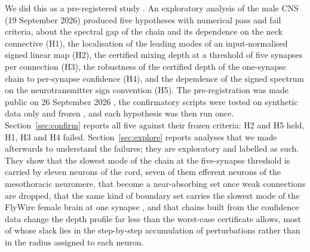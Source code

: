 We did this as a pre-registered study \cite{nosek2018}. An exploratory analysis of the male CNS
(19 September 2026) produced five hypotheses with numerical pass and fail criteria, about the
spectral gap of the chain and its dependence on the neck connective (H1), the localisation of the
leading modes of an input-normalised signed linear map (H2), the certified mixing depth at a
threshold of five synapses per connection (H3), the robustness of the certified depth of the
one-synapse chain to per-synapse confidence (H4), and the dependence of the signed spectrum on the neurotransmitter sign convention
(H5). The pre-registration was made public on 26 September 2026 \cite{kopel2026reg}, the
confirmatory scripts were tested on synthetic data only and frozen \cite{kopel2026freeze}, and each
hypothesis was then run once. Section~\ref{sec:confirm} reports all five against their frozen
criteria: H2 and H5 held, H1, H3 and H4 failed. Section~\ref{sec:explore} reports analyses that we
made afterwards to understand the failures; they are exploratory and labelled as such. They show
that the slowest mode of the chain at the five-synapse threshold is carried by eleven neurons of the
cord, seven of them efferent neurons of the mesothoracic neuromere, that become a near-absorbing set
once weak connections are dropped, that the same kind of boundary set carries the slowest mode of the FlyWire female brain at one
synapse \cite{dorkenwald2024,schlegel2024}, and that chains built from the confidence data change the depth
profile far less than the worst-case certificate allows, most of whose slack lies in the step-by-step
accumulation of perturbations rather than in the radius assigned to each neuron.

